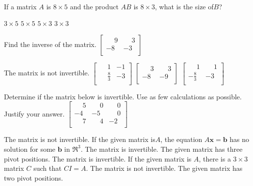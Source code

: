 \documentclass[11pt]{exam}
\begin{document}
\begin{questions}
\addpoints
\question[2]
If a matrix $A$ is $8\times 5$ and the product $AB$ is $8 \times 3$, what is the size of​ $B$?

\begin{oneparchoices}
\choice $3 \times 5$
\choice $5 \times 5$
\choice $5 \times 3$ %
\choice $3 \times 3$
\end{oneparchoices}
\answerline

\addpoints
\question[2]
Find the inverse of the matrix. $\left[\begin{array}{cc}\phantom{-}9 & \phantom{-}3 \\-8 & -3 \\ \end{array}\right]$

\begin{oneparchoices}
\choice The matrix is not invertible.
\choice $\left[\begin{array}{cc}\phantom{-}1 & -1 \\ \phantom{-}\frac{8}{3} & -3 \\ \end{array}\right]$
\choice $\left[\begin{array}{cc}\phantom{-}3 & \phantom{-}3 \\-8 & -9 \\ \end{array}\right]$
\choice $\left[\begin{array}{cc}\phantom{-}1 & \phantom{-}1 \\-\frac{8}{3} & -3 \\ \end{array}\right]$ %
\end{oneparchoices}
\answerline

\addpoints
\question[2]
Determine if the matrix below is invertible. Use as few calculations as possible. Justify your answer. \newline
$\left[\begin{array}{ccc}\phantom{-}5 & \phantom{-}0 & \phantom{-}0 \\ -4 & -5 & \phantom{-}0 \\ \phantom{-}7 & \phantom{-}4 & -2 \\ \end{array}\right]$

\begin{choices}
\choice The matrix is not invertible. If the given matrix is​ $A$, the equation $A\mathbf{x}=\mathbf{b}$ has no solution for some $\mathbf{b}$ in $\Re^{3}$.
\choice The matrix is invertible. The given matrix has three pivot positions. %
\choice The matrix is invertible. If the given matrix is $A$, there is a $3 \times 3$ matrix $C$ such that $CI=A$.
\choice The matrix is not invertible. The given matrix has two pivot positions.
\end{choices}
\answerline


\end{questions}
\end{document}

